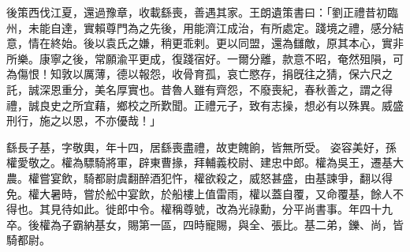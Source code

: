 \begin{pinyinscope}
 
 
 
 後策西伐江夏，還過豫章，收載繇喪，善遇其家。王朗遺策書曰：「劉正禮昔初臨州，未能自達，實賴尊門為之先後，用能濟江成治，有所處定。踐境之禮，感分結意，情在終始。後以袁氏之嫌，稍更乖剌。更以同盟，還為讎敵，原其本心，實非所樂。康寧之後，常願渝平更成，復踐宿好。一爾分離，款意不昭，奄然殂隕，可為傷恨！知敦以厲薄，德以報怨，收骨育孤，哀亡愍存，捐旣往之猜，保六尺之託，誠深恩重分，美名厚實也。昔魯人雖有齊怨，不廢喪紀，春秋善之，謂之得禮，誠良史之所宜藉，鄉校之所歎聞。正禮元子，致有志操，想必有以殊異。威盛刑行，施之以恩，不亦優哉！」
 
 
繇長子基，字敬輿，年十四，居繇喪盡禮，故吏餽餉，皆無所受。
 姿容美好，孫權愛敬之。權為驃騎將軍，辟東曹掾，拜輔義校尉、建忠中郎。權為吳王，遷基大農。權嘗宴飲，騎都尉虞翻醉酒犯忤，權欲殺之，威怒甚盛，由基諫爭，翻以得免。權大暑時，嘗於舩中宴飲，於船樓上值雷雨，權以蓋自覆，又命覆基，餘人不得也。其見待如此。徙郎中令。權稱尊號，改為光祿勳，分平尚書事。年四十九卒。後權為子霸納基女，賜第一區，四時寵賜，與全、張比。基二弟，鑠、尚，皆騎都尉。
 
 
\end{pinyinscope}